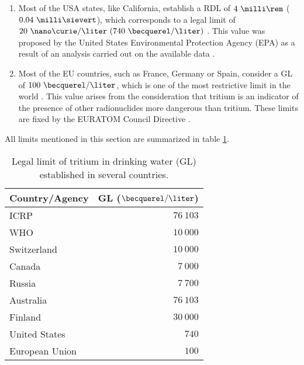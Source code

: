\begin{enumerate}
\item{} Most of the USA states, like California, establish a RDL of $4~\milli\rem$ ($0.04~\milli\sievert$), which corresponds to a legal limit of $20~\nano\curie/\liter~(740~\becquerel/\liter)$ \cite{California_GL}. This value was proposed by the United States Environmental Protection Agency (EPA) as a result of an analysis carried out on the available data \cite{USEPA_GL}.

\item{} Most of the EU countries, such as France, Germany or Spain, consider a GL of $100~\becquerel/\liter$, which is one of the most restrictive limit in the world \cite{France_GL, Germany_GL, Spain_GL}. This value arises from the consideration that tritium is an indicator of the presence of other radionuclides more dangerous than tritium. These limits are fixed by the EURATOM Council Directive \cite{EURATOM_GL}. 
\end{enumerate}

All limits mentioned in this section are summarized in table \ref{tab:LegalLimitTritium}.

\begin{table}[htbp]
\centering{}%
\begin{tabular}{lr}
\toprule 
Country/Agency & GL ($\becquerel/\liter$) \tabularnewline
\midrule
\midrule 
ICRP & $76~103$ \tabularnewline
WHO & $10~000$ \tabularnewline
Switzerland & $10~000$ \tabularnewline
Canada & $7~000$ \tabularnewline
Russia & $7~700$ \tabularnewline
Australia & $76~103$ \tabularnewline
Finland & $30~000$ \tabularnewline
United States & $740$ \tabularnewline
European Union & $100$ \tabularnewline
\bottomrule
\end{tabular}
\caption{Legal limit of tritium in drinking water (GL) established in several countries.}
\label{tab:LegalLimitTritium}
\end{table}